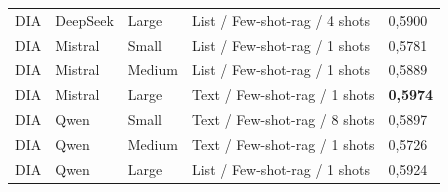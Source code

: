 \begin{table}[htbp]
\begin{tabular}{lllll}
DIA & DeepSeek & Large & List / Few-shot-rag / 4 shots & 0{,}5900 \\
DIA & Mistral & Small & List / Few-shot-rag / 1 shots & 0{,}5781 \\
DIA & Mistral & Medium & List / Few-shot-rag / 1 shots & 0{,}5889 \\
DIA & Mistral & Large & Text / Few-shot-rag / 1 shots & \textbf{0{,}5974} \\
DIA & Qwen & Small & Text / Few-shot-rag / 8 shots & 0{,}5897 \\
DIA & Qwen & Medium & Text / Few-shot-rag / 1 shots & 0{,}5726 \\
DIA & Qwen & Large & List / Few-shot-rag / 1 shots & 0{,}5924 \\
\bottomrule
\end{tabular}
\end{table}
